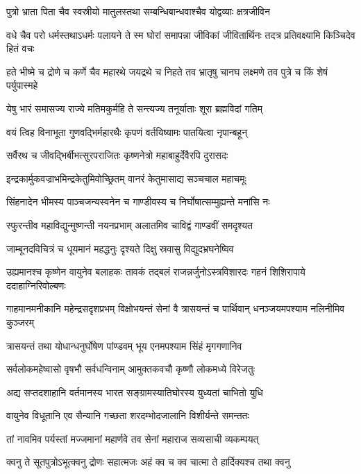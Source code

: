 \twolineshloka
{पुत्रो भ्राता पिता चैव स्वस्रीयो मातुलस्तथा}
{सम्बन्धिबान्धवाश्चैव योद्वव्याः क्षत्रजीविन}


\threelineshloka
{वधे चैव परो धर्मस्तथाऽधर्मः पलायने}
{ते स्म घोरां समापन्ना जीविकां जीवितार्थिनः}
{तदत्र प्रतिवक्ष्यामि किञ्चिदेव हितं वचः}


\threelineshloka
{हते भीष्मे च द्रोणे च कर्णे चैव महारथे}
{जयद्रथे च निहते तव भ्रातृषु चानघ}
{लक्ष्मणे तव पुत्रे च किं शेषं पर्युपास्महे}


\twolineshloka
{येषु भारं समासज्य राज्ये मतिमकुर्महि}
{ते सन्त्यज्य तनूर्याताः शूरा ब्रह्मविदां गतिम्}


\twolineshloka
{वयं त्विह विनाभूता गुणवद्भिर्महारथैः}
{कृपणं वर्तयिष्यामः पातयित्वा नृपान्बहून्}


\twolineshloka
{सर्वैरथ च जीवद्भिर्बीभत्सुरपराजितः}
{कृष्णनेत्रो महाबाहुर्देवैरपि दुरासदः}


\twolineshloka
{इन्द्रकार्मुकवज्राभमिन्द्रकेतुमिवोच्छ्रितम्}
{वानरं केतुमासाद्य सञ्चचाल महाचमूः}


\twolineshloka
{सिंहनादेन भीमस्य पाञ्चजन्यस्वनेन च}
{गाण्डीवस्य च निर्घोषात्सम्मुह्यन्ते मनांसि नः}


\twolineshloka
{स्फुरन्तीव महाविद्युन्मुष्णन्ती नयनप्रभाम्}
{अलातमिव चाविद्वं गाण्डवीं समदृश्यत}


\twolineshloka
{जाम्बूनदविचित्रं च धूयमानं महद्धनुः}
{दृश्यते दिक्षु स्रवासु विद्युदभ्रघनेष्विव}


\threelineshloka
{उह्यमानश्च कृष्णेन वायुनेव बलाहकः}
{तावकं तद्बलं राजन्नर्जुनोऽस्त्रविशारदः}
{गहनं शिशिरापाये ददाहाग्निरिवोल्बणः}


\threelineshloka
{गाहमानमनीकानि महेन्द्रसदृशप्रभम्}
{विक्षोभयन्तं सेनां वै त्रासयन्तं च पार्थिवान्}
{धनञ्जयमपश्याम नलिनीमिव कुञ्जरम्}


\twolineshloka
{त्रासयन्तं तथा योधान्धनुर्घोषेण पांण्डवम्}
{भूय एनमपश्याम सिंहं मृगगणानिव}


\twolineshloka
{सर्वलोकमहेष्वासो वृषभौ सर्वधन्विनाम्}
{आमुक्तकवचौ कृष्णौ लोकमध्ये विरेजतुः}


\twolineshloka
{अद्य सप्तदशाहानि वर्तमानस्य भारत}
{सङ्ग्रामस्यातिघोरस्य युध्यतां चाभितो युधि}


\twolineshloka
{वायुनेव विधूतानि एव सैन्यानि गच्छता}
{शरदम्भोदजालानि विशीर्यन्ते समन्ततः}


\twolineshloka
{तां नावमिव पर्यस्तां मज्जमानां महार्णवे}
{तव सेनां महाराज सव्यसाची व्यकम्पयत्}


\twolineshloka
{क्वनु ते सूतपुत्रोऽभूत्क्वनु द्रोणः सहात्मजः}
{अहं क्व च क्व चात्मा ते हार्दिक्यश्च तथा क्वनु}


